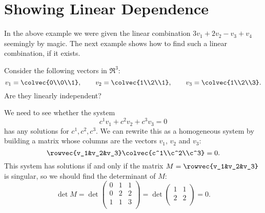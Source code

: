 
\section{Showing Linear Dependence}
In the above example we were given the linear combination \(3v_1+2v_2-v_3+v_4\) seemingly by magic. The next example shows how to find such a linear combination, if it exists.

\begin{example}
Consider the following vectors in $\Re^3$:
\[
v_1=\colvec{0\\0\\1}, 
\qquad v_2=\colvec{1\\2\\1},
\qquad v_3=\colvec{1\\2\\3}.
\]
Are they linearly independent?

We need to see whether the system 
\[
c^1v_1 + c^2v_2+ c^3v_3=0
\]
has any solutions for $c^1, c^2, c^3$.  We can rewrite this as a homogeneous system by building a matrix whose columns are the vectors $v_1$, $v_2$ and $v_3$:
\[
\rowvec{v_1&v_2&v_3}\colvec{c^1\\c^2\\c^3}=0.
\]
This system has solutions if and only if the matrix $M=\rowvec{v_1&v_2&v_3}$ is singular, so we should find the determinant of $M$:
\[
\det M = \det \begin{pmatrix}
0 & 1 & 1 \\
0 & 2 & 2 \\
1 & 1 & 3 \\
\end{pmatrix}
= \det \begin{pmatrix}
1 & 1 \\
2 & 2 \\
\end{pmatrix}
=0.
\]


\end{example}
